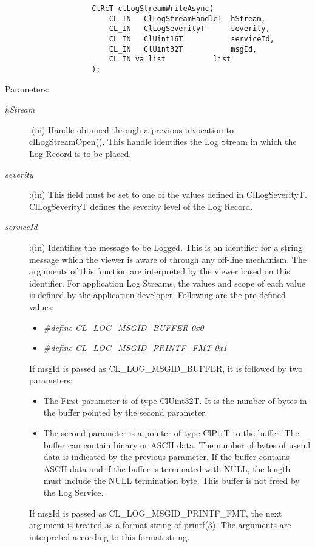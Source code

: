 \begin{flushleft}
\begin{Desc}
\begin{verbatim}
					ClRcT clLogStreamWriteAsync(
						CL_IN	ClLogStreamHandleT	hStream, 
						CL_IN	ClLogSeverityT		severity,
						CL_IN	ClUint16T			serviceId,
						CL_IN	ClUint32T			msgId,
						CL_IN va_list			list
					);
\end{verbatim}
\normalsize
\end{Desc}
\begin{Desc}
\item[Parameters:] \begin{description}
\item[{\em hStream}]:(in) Handle obtained through a previous invocation to clLogStreamOpen(). This handle identifies the Log Stream in which the
Log Record is to be placed.
\item[{\em severity}]:(in) This field must be set to one of the values defined in ClLogSeverityT. ClLogSeverityT defines the severity level of the 
Log Record.
\item[{\em serviceId}]:(in) Identifies the message to be Logged. This is an identifier for a string message which the viewer is aware of through any 
off-line mechanism. The arguments of this function are interpreted by the viewer based on this identifier. For application Log Streams, the values and 
scope of each value is defined by the application developer. Following are the pre-defined values:
\begin{itemize}
\item
\textit{\#define CL\_\-LOG\_\-MSGID\_\-BUFFER		0x0}
\item
\textit{\#define CL\_\-LOG\_\-MSGID\_\-PRINTF\_\-FMT	     0x1}
\end{itemize}
If msgId is passed as CL\_\-LOG\_\-MSGID\_\-BUFFER, it is followed by two parameters:
\begin{itemize}
\item
The First parameter is of type ClUint32T. It is the number of bytes in the buffer pointed by the second parameter.
\item
The second parameter is a pointer of type ClPtrT to the buffer. The buffer can contain binary or ASCII data. The number of bytes of useful data is 
indicated by the previous parameter. If the buffer contains ASCII data and if the buffer is terminated  with NULL, the length must include the NULL 
termination byte. This buffer is not freed by the Log Service.
\end{itemize}
If msgId is passed as CL\_\-LOG\_\-MSGID\_\-PRINTF\_\-FMT, the next argument is treated as a format string of printf(3). The arguments are interpreted 
according to this format string.

\end{description}
\end{Desc}
\end{flushleft}

